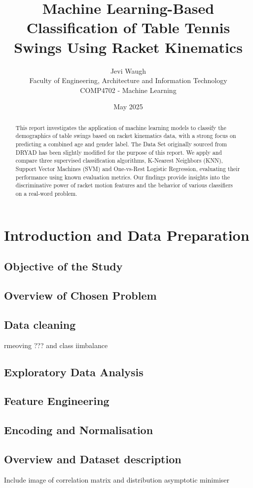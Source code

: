 \documentclass[12pt]{article}
\title{\textbf{Machine Learning-Based Classification of Table Tennis Swings Using Racket Kinematics}}
\author{Jevi Waugh \\
Faculty of Engineering, Architecture and Information Technology \\
COMP4702 - Machine Learning}
\date{May 2025}
\begin{document}
\maketitle

\begin{abstract}
This report investigates the application of machine learning models to classify the demographics of table swings based on racket kinematics data, with a strong focus on predicting a combined age and gender label. The Data Set originally sourced from DRYAD has been slightly modified for the purpose of this report. We apply and compare three supervised classification algorithms, K-Nearest Neighbors (KNN), Support Vector Machines (SVM) and One-vs-Rest Logistic Regression, evaluating their performance using known evaluation metrics. Our findings provide insights into the discriminative power of racket motion features and the behavior of various classifiers on a real-word problem.
\end{abstract}

\section{Introduction and Data Preparation}
\subsection{Objective of the Study}
\subsection{Overview of Chosen Problem}
\subsection{Data cleaning}
rmeoving ??? and class iimbalance

\begin{multicols}{2}
\section{Exploratory Data Analysis}
\subsection{Feature Engineering}
\subsection{Encoding and Normalisation}
\subsection{Overview and Dataset description}
Include image of correlation matrix and distribution
asymptotic minimiser
\end{multicols}
\end{document}
